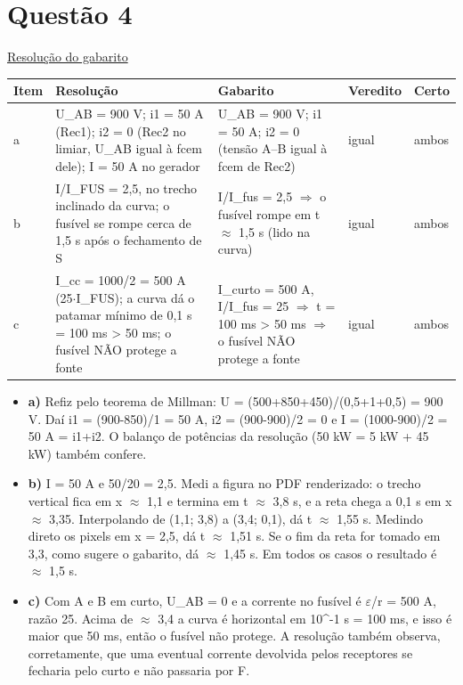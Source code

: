 \documentclass{article}%
\begin{document}
\section*{Questão 4}%
\href{https://poliedroresolve.sistemapoliedro.com.br/vestibulares/ime/2027/ime-2-fase-dia-2-27-10-2026-2-fase-dia-2/dissertativa-4-fisica-2-fase-dia-2-ime-2027}{Resolução do gabarito}\par\smallskip%
\begin{longtable}{@{}p{} p{} p{} p{} p{}@{}}\toprule Item & Resolução & Gabarito & Veredito & Certo \\ \midrule
a & U\_AB = 900 V; i1 = 50 A (Rec1); i2 = 0 (Rec2 no limiar, U\_AB igual à fcem dele); I = 50 A no gerador & U\_AB = 900 V; i1 = 50 A; i2 = 0 (tensão A--B igual à fcem de Rec2) & igual & ambos \\
b & I/I\_FUS = 2,5, no trecho inclinado da curva; o fusível se rompe cerca de 1,5 s após o fechamento de S & I/I\_fus = 2,5 $\Rightarrow$ o fusível rompe em t $\approx$ 1,5 s (lido na curva) & igual & ambos \\
c & I\_cc = 1000/2 = 500 A (25$\cdot$I\_FUS); a curva dá o patamar mínimo de 0,1 s = 100 ms > 50 ms; o fusível NÃO protege a fonte & I\_curto = 500 A, I/I\_fus = 25 $\Rightarrow$ t = 100 ms > 50 ms $\Rightarrow$ o fusível NÃO protege a fonte & igual & ambos \\
\bottomrule\end{longtable}%
\begin{itemize}%
\item%
\textbf{a)} Refiz pelo teorema de Millman: U = (500+850+450)/(0,5+1+0,5) = 900 V. Daí i1 = (900-850)/1 = 50 A, i2 = (900-900)/2 = 0 e I = (1000-900)/2 = 50 A = i1+i2. O balanço de potências da resolução (50 kW = 5 kW + 45 kW) também confere.%
\item%
\textbf{b)} I = 50 A e 50/20 = 2,5. Medi a figura no PDF renderizado: o trecho vertical fica em x $\approx$ 1,1 e termina em t $\approx$ 3,8 s, e a reta chega a 0,1 s em x $\approx$ 3,35. Interpolando de (1,1; 3,8) a (3,4; 0,1), dá t $\approx$ 1,55 s. Medindo direto os pixels em x = 2,5, dá t $\approx$ 1,51 s. Se o fim da reta for tomado em 3,3, como sugere o gabarito, dá $\approx$ 1,45 s. Em todos os casos o resultado é $\approx$ 1,5 s.%
\item%
\textbf{c)} Com A e B em curto, U\_AB = 0 e a corrente no fusível é $\varepsilon$/r = 500 A, razão 25. Acima de $\approx$ 3,4 a curva é horizontal em 10\^{}{-}1 s = 100 ms, e isso é maior que 50 ms, então o fusível não protege. A resolução também observa, corretamente, que uma eventual corrente devolvida pelos receptores se fecharia pelo curto e não passaria por F.%
\end{itemize}%
\end{document}
